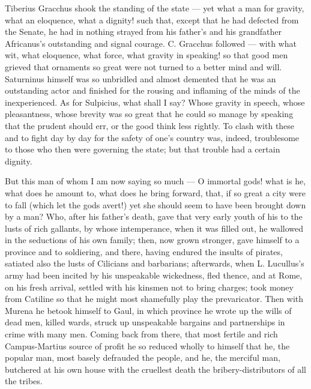  Tiberius Gracchus shook the standing of the state --- yet what a man for gravity, what an eloquence, what a dignity! such that, except that he had defected from the Senate, he had in nothing strayed from his father's and his grandfather Africanus's outstanding and signal courage. C. Gracchus followed --- with what wit, what eloquence, what force, what gravity in speaking! so that good men grieved that ornaments so great were not turned to a better mind and will. Saturninus himself was so unbridled and almost demented that he was an outstanding actor and finished for the rousing and inflaming of the minds of the inexperienced. As for Sulpicius, what shall I say? Whose gravity in speech, whose pleasantness, whose brevity was so great that he could so manage by speaking that the prudent should err, or the good think less rightly. To clash with these and to fight day by day for the safety of one's country was, indeed, troublesome to those who then were governing the state; but that trouble had a certain dignity.

 But this man of whom I am now saying so much --- O immortal gods! what is he, what does he amount to, what does he bring forward, that, if so great a city were to fall (which let the gods avert!) yet she should seem to have been brought down by a man? Who, after his father's death, gave that very early youth of his to the lusts of rich gallants, by whose intemperance, when it was filled out, he wallowed in the seductions of his own family; then, now grown stronger, gave himself to a province and to soldiering, and there, having endured the insults of pirates, satiated also the lusts of Cilicians and barbarians; afterwards, when L. Lucullus's army had been incited by his unspeakable wickedness, fled thence, and at Rome, on his fresh arrival, settled with his kinsmen not to bring charges; took money from Catiline so that he might most shamefully play the prevaricator. Then with Murena he betook himself to Gaul, in which province he wrote up the wills of dead men, killed wards, struck up unspeakable bargains and partnerships in crime with many men. Coming back from there, that most fertile and rich Campus-Martius source of profit he so reduced wholly to himself that he, the popular man, most basely defrauded the people, and he, the merciful man, butchered at his own house with the cruellest death the bribery-distributors of all the tribes.

